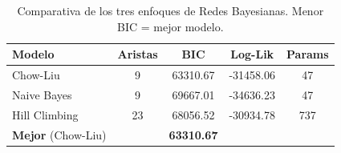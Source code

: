 \begin{table}[H]
\centering
\begin{tabular}{lcccc}
\toprule
\textbf{Modelo} & \textbf{Aristas} & \textbf{BIC} & \textbf{Log-Lik} & \textbf{Params} \\
\midrule
Chow-Liu & 9 & 63310.67 & -31458.06 & 47 \\
Naive Bayes & 9 & 69667.01 & -34636.23 & 47 \\
Hill Climbing & 23 & 68056.52 & -30934.78 & 737 \\
\midrule
\rowcolor{blue!15}
\textbf{Mejor} (Chow-Liu) & & \textbf{63310.67} & & \\
\bottomrule
\end{tabular}
\caption{Comparativa de los tres enfoques de Redes Bayesianas. Menor BIC = mejor modelo.}
\end{table}
